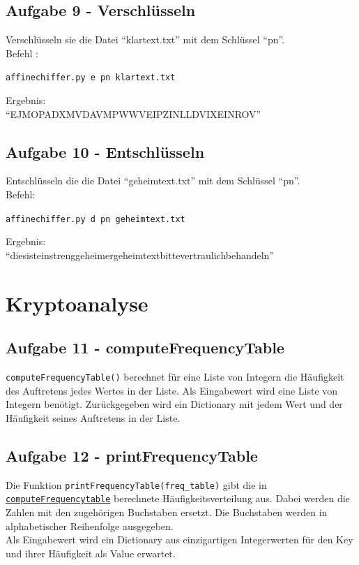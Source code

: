 \documentclass[12pt]{article}
\begin{document}
\newpage
		\subsection{Aufgabe 9 - Verschl\"usseln}
		Verschl\"usseln sie die Datei \enquote{klartext.txt} mit dem Schl\"ussel \enquote{pn}.\\
Befehl :
		\begin{center}
			\texttt{affinechiffer.py e pn klartext.txt}
		\end{center}
Ergebnis:\\
\enquote{EJMOPADXMVDAVMPWWVEIPZINLLDVIXEINROV}
 
		\subsection{Aufgabe 10 - Entschl\"usseln}
		Entschl\"usseln die die Datei \enquote{geheimtext.txt} mit dem Schl\"ussel \enquote{pn}.\\
Befehl:
			\begin{center}
				\texttt{affinechiffer.py d pn geheimtext.txt}
			\end{center}
Ergebnis:\\ \enquote{diesisteinstrenggeheimergeheimtextbittevertraulichbehandeln}

\newpage

	\section{Kryptoanalyse}
		\subsection{\label{ssec:Aufgabe11}Aufgabe 11 - computeFrequencyTable}
		\texttt{computeFrequencyTable()} berechnet f\"ur eine Liste von Integern die H\"aufigkeit des Auftretens jedes Wertes in der Liste.
Als Eingabewert wird eine Liste von Integern ben\"otigt. Zur\"uckgegeben wird ein Dictionary mit jedem Wert und der H\"aufigkeit seines Auftretens in der Liste.
			
			
		\subsection{Aufgabe 12 - printFrequencyTable}
			Die Funktion \texttt{printFrequencyTable(freq\_table)} gibt die in \hyperref[ssec:Aufgabe11]{\texttt{computeFrequencytable}} berechnete H\"aufigkeitsverteilung aus. Dabei werden die Zahlen mit den zugeh\"origen Buchstaben ersetzt. Die Buchstaben werden in alphabetischer Reihenfolge ausgegeben.\\
Als Eingabewert wird ein Dictionary aus einzigartigen Integerwerten f\"ur den Key und ihrer H\"aufigkeit als Value erwartet.
			
			
\end{document}

